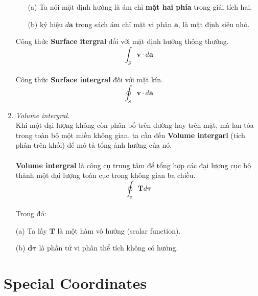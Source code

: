 \begin{enumerate}
\begin{enumerate}
  \item[(a)] Ta nói mặt định hướng là ám chỉ \textbf{mặt hai phía} trong giải tích hai.
  \item[(b)] ký hiệu $d \mathbf{a}$ trong sách ám chỉ mặt vi phân $\mathbf{a}$, là mặt định siêu nhỏ.
\end{enumerate}

Công thức \textbf{Surface itergral} đối với mặt định hướng thông thường.
\[
\int_{S} \mathbf{v} \cdot d\mathbf{a}
\]
\\
Công thức \textbf{Surface intergral} đối với mặt kín.
\[
\oint_{S} \mathbf{v} \cdot d\mathbf{a}
\]

\item \textit{Volume intergral.}\\
Khi một đại lượng không còn phân bố trên đường hay trên mặt, mà lan tỏa trong toàn bộ một miền không gian, ta cần đến \textbf{Volume intergarl} (tích phân trên khối) để mô tả tổng ảnh hưởng của nó.
\\ \\
\textbf{Volume intergral} là công cụ trung tâm để tổng hợp các đại lượng cục bộ thành một đại lượng toàn cục trong không gian ba chiều.
\[
\oint_{v} \mathbf{T} d\mathbf{\tau}
\]
\\ Trong đó:
\end{enumerate}
\begin{enumerate}
  \item[(a)] Ta lấy $\mathbf{T}$ là một hàm vô hướng (scalar function).
  \item[(b)] $\mathbf{d \tau}$ là phần tử vi phân thể tích không có hướng.
\end{enumerate}

\section{Special Coordinates}

